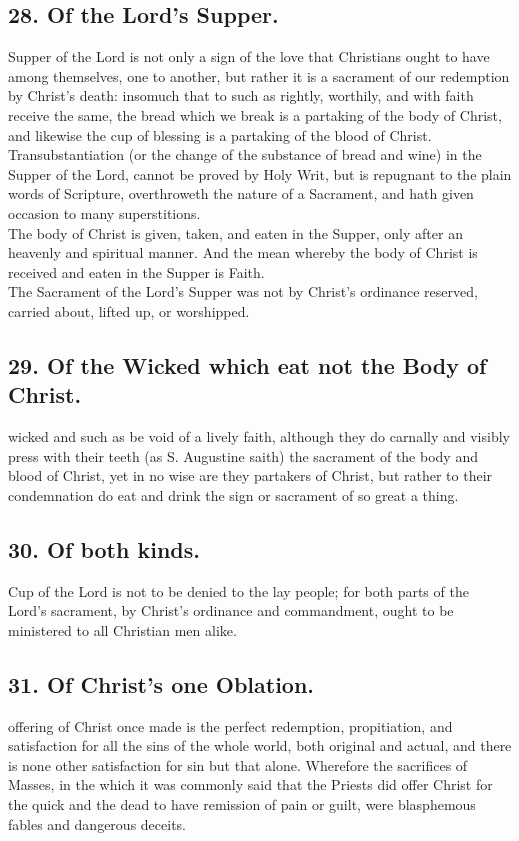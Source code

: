 \subsection{28. Of the Lord's Supper.}
 Supper of the Lord is not only a sign of the love that Christians ought to have among themselves, one to another, but rather it is a sacrament of our redemption by Christ's death: insomuch that to such as rightly, worthily, and with faith receive the same, the bread which we break is a partaking of the body of Christ, and likewise the cup of blessing is a partaking of the blood of Christ.\\
Transubstantiation (or the change of the substance of bread and wine) in the Supper of the Lord, cannot be proved by Holy Writ, but is repugnant to the plain words of Scripture, overthroweth the nature of a Sacrament, and hath given occasion to many superstitions.\\
The body of Christ is given, taken, and eaten in the Supper, only after an heavenly and spiritual manner. And the mean whereby the body of Christ is received and eaten in the Supper is Faith.\\
The Sacrament of the Lord's Supper was not by Christ's ordinance reserved, carried about, lifted up, or worshipped.

\subsection{29. Of the Wicked which eat not the Body of Christ.}
 wicked and such as be void of a lively faith, although they do carnally and visibly press with their teeth (as S. Augustine saith) the sacrament of the body and blood of Christ, yet in no wise are they partakers of Christ, but rather to their condemnation do eat and drink the sign or sacrament of so great a thing.

\subsection{30. Of both kinds.}
 Cup of the Lord is not to be denied to the lay people; for both parts of the Lord's sacrament, by Christ's ordinance and commandment, ought to be ministered to all Christian men alike.

\subsection{31. Of Christ's one Oblation.}
 offering of Christ once made is the perfect redemption, propitiation, and satisfaction for all the sins of the whole world, both original and actual, and there is none other satisfaction for sin but that alone. Wherefore the sacrifices of Masses, in the which it was commonly said that the Priests did offer Christ for the quick and the dead to have remission of pain or guilt, were blasphemous fables and dangerous deceits.

